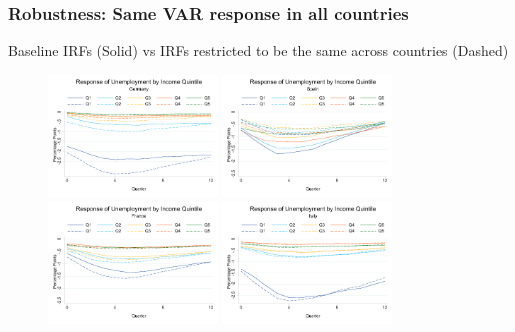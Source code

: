 \documentclass[pdflatex,aspectratio=169]{beamer}
\begin{document}
\begin{frame}\frametitle{\bf Robustness: Same VAR response in all countries \hypertarget{SameXC}{}}
{\scriptsize Baseline IRFs (Solid) vs IRFs restricted to be the same across countries (Dashed) \hyperlink{Robust}{}}

\begin{figure}
\begin{center}
\includegraphics[width=0.40\textwidth]{./figures/UR_chart_DE_compare_noXC}
\includegraphics[width=0.40\textwidth]{./figures/UR_chart_ES_compare_noXC}\\
\includegraphics[width=0.40\textwidth]{./figures/UR_chart_FR_compare_noXC}
\includegraphics[width=0.40\textwidth]{./figures/UR_chart_IT_compare_noXC}
\end{center}
\end{figure}

\end{frame}
\end{document}
